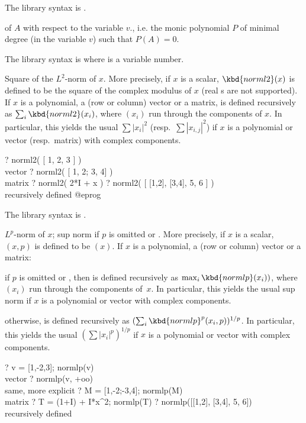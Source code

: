 The library syntax is .

\label{se:minpoly}
of $A$ with respect to the variable $v$., i.e. the monic polynomial $P$
of minimal degree (in the variable $v$) such that $P(A) = 0$.

The library syntax is  where  is a variable number.

\label{se:norml2}
Square of the $L^2$-norm of $x$. More precisely,
if $x$ is a scalar, $\kbd{norml2}(x)$ is defined to be the square
of the complex modulus of $x$ (real s are not supported).
If $x$ is a polynomial, a (row or column) vector or a matrix,  is
defined recursively as $\sum_i \kbd{norml2}(x_i)$, where $(x_i)$ run through
the components of $x$. In particular, this yields the usual $\sum |x_i|^2$
(resp.~$\sum |x_{i,j}|^2$) if $x$ is a polynomial or vector (resp.~matrix) with
complex components.

\bprog
? norml2( [ 1, 2, 3 ] )      \\ vector
? norml2( [ 1, 2; 3, 4] )   \\ matrix
? norml2( 2*I + x )
? norml2( [ [1,2], [3,4], 5, 6 ] )   \\ recursively defined
@eprog

The library syntax is .

\label{se:normlp}
$L^p$-norm of $x$; sup norm if $p$ is omitted or . More precisely,
if $x$ is a scalar, $(x, p)$ is defined to be $(x)$.
If $x$ is a polynomial, a (row or column) vector or a matrix:

\item  if $p$ is omitted or , then  is defined
recursively as $\max_i \kbd{normlp}(x_i))$, where $(x_i)$ run through the
components of~$x$. In particular, this yields the usual sup norm if $x$ is a
polynomial or vector with complex components.

\item otherwise,  is defined recursively as $(\sum_i
\kbd{normlp}^p(x_i,p))^{1/p}$. In particular, this yields the usual $(\sum
|x_i|^p)^{1/p}$ if $x$ is a polynomial or vector with complex components.

\bprog
? v = [1,-2,3]; normlp(v)      \\ vector
? normlp(v, +oo)               \\ same, more explicit
? M = [1,-2;-3,4]; normlp(M)   \\ matrix
? T = (1+I) + I*x^2; normlp(T)
? normlp([[1,2], [3,4], 5, 6])   \\ recursively defined

